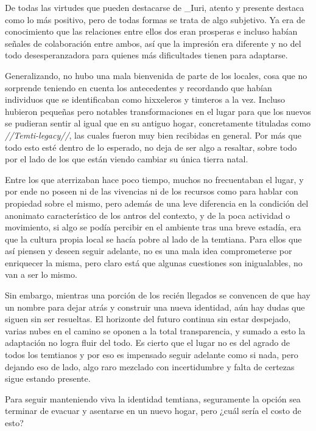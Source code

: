 \documentclass[
  spanish,
]{book}
\begin{document}
De todas las virtudes que pueden destacarse de \_Iuri, atento y presente destaca como lo más positivo, pero de todas formas se trata de algo subjetivo. Ya era de conocimiento que las relaciones entre ellos dos eran prosperas e incluso habían señales de colaboración entre ambos, así que la impresión era diferente y no del todo desesperanzadora para quienes más dificultades tienen para adaptarse.

Generalizando, no hubo una mala bienvenida de parte de los locales, cosa que no sorprende teniendo en cuenta los antecedentes y recordando que habían individuos que se identificaban como hixxeleros y timteros a la vez. Incluso hubieron pequeñas pero notables transformaciones en el lugar para que los nuevos se pudieran sentir al igual que en su antiguo hogar, concretamente tituladas como \emph{//Temti-legacy//}, las cuales fueron muy bien recibidas en general. Por más que todo esto esté dentro de lo esperado, no deja de ser algo a resaltar, sobre todo por el lado de los que están viendo cambiar su única tierra natal.

Entre los que aterrizaban hace poco tiempo, muchos no frecuentaban el lugar, y por ende no poseen ni de las vivencias ni de los recursos como para hablar con propiedad sobre el mismo, pero además de una leve diferencia en la condición del anonimato característico de los antros del contexto, y de la poca actividad o movimiento, si algo se podía percibir en el ambiente tras una breve estadía, era que la cultura propia local se hacía pobre al lado de la temtiana. Para ellos que así piensen y deseen seguir adelante, no es una mala idea comprometerse por enriquecer la misma, pero claro está que algunas cuestiones son inigualables, no van a ser lo mismo.

Sin embargo, mientras una porción de los recién llegados se convencen de que hay un nombre para dejar atrás y construir una nueva identidad, aún hay dudas que siguen sin ser resueltas. El horizonte del futuro continua sin estar despejado, varias nubes en el camino se oponen a la total transparencia, y sumado a esto la adaptación no logra fluir del todo. Es cierto que el lugar no es del agrado de todos los temtianos y por eso es impensado seguir adelante como si nada, pero dejando eso de lado, algo raro mezclado con incertidumbre y falta de certezas sigue estando presente.

Para seguir manteniendo viva la identidad temtiana, seguramente la opción sea terminar de evacuar y asentarse en un nuevo hogar, pero ¿cuál sería el costo de esto?
\end{document}
